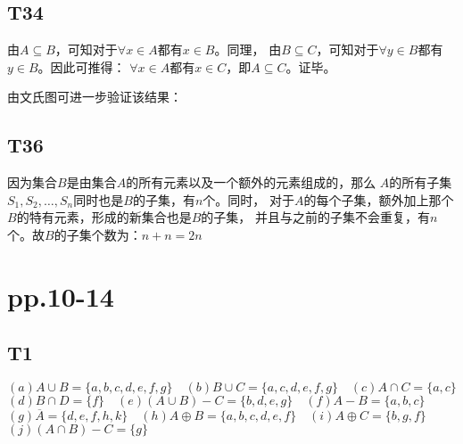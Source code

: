 \documentclass{article}
\begin{document}
\subsection{T34}
由$A \subseteq B$，可知对于$\forall x \in A$都有$x \in B$。同理，
由$B \subseteq C$，可知对于$\forall y \in B$都有$y \in B$。因此可推得：
$\forall x \in A$都有$x \in C$，即$A \subseteq C$。证毕。

由文氏图可进一步验证该结果：


\subsection{T36}
因为集合$B$是由集合$A$的所有元素以及一个额外的元素组成的，那么
$A$的所有子集$S_1, S_2, \dots, S_n$同时也是$B$的子集，有$n$个。同时，
对于$A$的每个子集，额外加上那个$B$的特有元素，形成的新集合也是$B$的子集，
并且与之前的子集不会重复，有$n$个。故$B$的子集个数为：$n + n = 2n$

\section{pp.10-14}
\subsection{T1}\noindent
$(a) A \cup B  = \{a, b, c, d, e, f, g\} \quad (b) B \cup C = \{a, c, d, e, f, g\} \quad (c) A \cap C = \{a, c\}$\\
$(d) B \cap D = \{f\}\quad (e) (A \cup B) - C = \{b, d, e, g\} \quad (f) A - B = \{a, b, c\}$\\ 
$(g) \overline{A} = \{d, e, f, h, k\} \quad (h) A \oplus B = \{a, b, c, d, e, f\} \quad (i) A \oplus C = \{b, g, f\}$\\
$(j) (A \cap B) - C = \{g\}$
\end{document}
